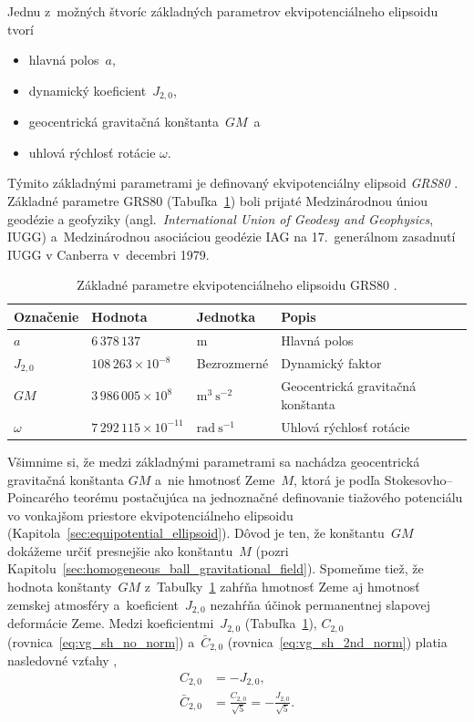 \documentclass[a4paper, 12pt]{book}
\begin{document}
Jednu z~možných štvoríc základných parametrov ekvipotenciálneho elipsoidu tvorí
%
\begin{itemize}
\item hlavná polos~$a$,
%
\item dynamický koeficient~$J_{2,0}$,
%
\item geocentrická gravitačná konštanta~$GM$~a
%
\item uhlová rýchlosť rotácie $\omega$.
\end{itemize}
%
Týmito základnými parametrami je definovaný ekvipotenciálny elipsoid 
\emph{GRS80} \parencite[angl. \textit{Geodetic Reference 
System~1980};][]{GRS80}.  Základné parametre GRS80 
(Tabuľka~\ref{tab:grs80_fundamental}) boli prijaté Medzinárodnou úniou geodézie 
a geofyziky (angl.~\textit{International Union of Geodesy and Geophysics}, 
IUGG) a~Medzinárodnou asociáciou geodézie IAG na 17.~generálnom zasadnutí IUGG 
v Canberra v~decembri 1979.

\begin{table}
\begin{center}
\caption{Základné parametre ekvipotenciálneho elipsoidu GRS80 
\parencite{GRS80}.}
\label{tab:grs80_fundamental}
\small
\begin{tabular}{l l l l}
\hline
Označenie & Hodnota & Jednotka & Popis\\
\hline
$a$       & $6\,378\,137$ & m & Hlavná polos\\
$J_{2,0}$ & $108\,263 \times 10^{-8}$ & Bezrozmerné & Dynamický faktor\\
$GM$ & $3\,986\,005 \times 10^8$ & $\mathrm{m}^3 \ \mathrm{s}^{-2}$ 
& Geocentrická gravitačná konštanta\\
$\omega$ & $7\,292\,115 \times 10^{-11}$ & $\mathrm{rad} \ \mathrm{s}^{-1}$ 
& Uhlová rýchlosť rotácie\\
\hline
\end{tabular}
\end{center}
\end{table}

Všimnime si, že medzi základnými parametrami sa nachádza geocentrická 
gravitačná konštanta $GM$ a~nie hmotnosť Zeme~$M$, ktorá je podľa 
Stokesovho--Poincarého teorému postačujúca na jednoznačné definovanie tiažového 
potenciálu vo vonkajšom priestore ekvipotenciálneho elipsoidu 
(Kapitola~\ref{sec:equipotential_ellipsoid}).  Dôvod je ten, že konštantu~$GM$ 
dokážeme určiť presnejšie ako konštantu~$M$ (pozri 
Kapitolu~\ref{sec:homogeneous_ball_gravitational_field}).  Spomeňme tiež, že 
hodnota konštanty~$GM$ z~Tabuľky~\ref{tab:grs80_fundamental} zahŕňa hmotnosť 
Zeme aj hmotnosť zemskej atmosféry a~koeficient~$J_{2,0}$ nezahŕňa účinok 
permanentnej slapovej deformácie Zeme.  Medzi koeficientmi~$J_{2,0}$ 
(Tabuľka~\ref{tab:grs80_fundamental}), $C_{2,0}$ 
(rovnica~\ref{eq:vg_sh_no_norm}) a~$\bar{C}_{2,0}$ 
(rovnica~\ref{eq:vg_sh_2nd_norm}) platia nasledovné vzťahy 
\parencite{Moritz1967,MoritzPhysicalGeodesy},
%
\begin{align}
\label{eq:c20_j20}
C_{2,0} &= -J_{2,0}{,}\\
%
\label{eq:c20_j20_2}
\bar{C}_{2,0} &= \frac{C_{2,0}}{\sqrt{5}} = -\frac{J_{2,0}}{\sqrt{5}}{.}
\end{align}
\end{document}
